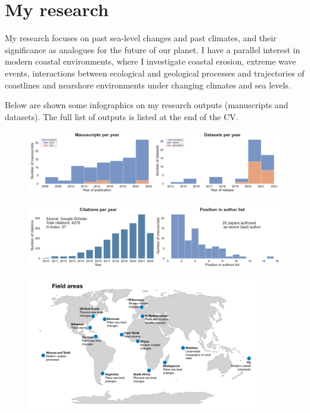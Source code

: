 \documentclass[%
               doublesided,
               paper=a4,
               fontsize=10pt
              ]{my-resume}
\begin{document}
\pagestyle{empty}

\section[\faAreaChart]{My research}
\pubforcefullwidth
My research focuses on past sea-level changes and past climates, and their significance as  analogues for the future of our planet. ​I have a parallel interest in modern coastal environments, where I investigate coastal erosion, extreme wave events, interactions between ecological and geological processes and trajectories of coastlines and nearshore environments under changing climates and sea levels. 

\bigskip

Below are shown some infographics on my research outputs (manuscripts and datasets). The full list of outputs is listed at the end of the CV.
\bigskip

\begin{figure}[h]
\centering
\includegraphics[width=\textwidth]{img/products_per_year.png}
\end{figure}

\begin{figure}[h]
\centering
\includegraphics[width=\textwidth]{img/citations_authors.png} 
\end{figure}

\begin{figure}[h]
\centering
\includegraphics[width=0.9\textwidth]{img/field_data.pdf} 
\end{figure}
\end{document}
